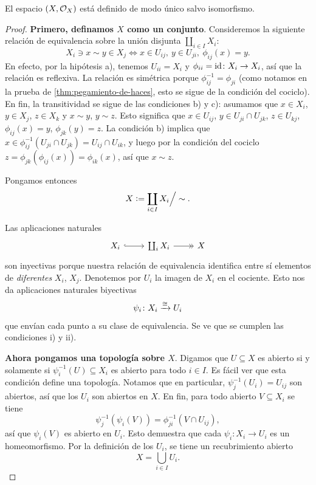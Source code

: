 \documentclass{article}
\numberwithin{equation}{section}
\theoremstyle{definition}
\begin{document}
\begin{teorema}
  El espacio $(X,\mathcal{O}_X)$ está definido de modo único salvo isomorfismo.

  \begin{proof}
    \textbf{Primero, definamos $X$ como un conjunto}.  Consideremos la siguiente
    relación de equivalencia sobre la unión disjunta $\coprod_{i\in I} X_i$:
    \[ X_i \ni x \sim y \in X_j \iff x \in U_{ij}, ~
       y \in U_{ji}, ~ \phi_{ij} (x) = y. \]
    En efecto, por la hipótesis a), tenemos $U_{ii} = X_i$ y
    $\phi_{ii} = \mathrm{id}\colon X_i \to X_i$, así que la relación es reflexiva.
    La relación es simétrica porque $\phi_{ij}^{-1} = \phi_{ji}$ (como notamos
    en la prueba de \ref{thm:pegamiento-de-haces}, esto se sigue de la condición
    del cociclo). En fin, la transitividad se sigue de las condiciones b) y c):
    asumamos que $x \in X_i$, $y \in X_j$, $z \in X_k$ y $x \sim y$, $y \sim
    z$. Esto significa que $x \in U_{ij}$, $y \in U_{ji} \cap U_{jk}$,
    $z \in U_{kj}$, $\phi_{ij} (x) = y$, $\phi_{jk} (y) = z$. La condición b)
    implica que
    $x \in \phi_{ij}^{-1} (U_{ji} \cap U_{jk}) = U_{ij} \cap U_{ik}$, y luego
    por la condición del cociclo
    $z = \phi_{jk} (\phi_{ij} (x)) = \phi_{ik} (x)$, así que $x \sim z$.

    Pongamos entonces
    $$X \mathrel{\mathop:}= \coprod_{i\in I} X_i \Bigr/ \sim.$$

    Las aplicaciones naturales
    \[ \begin{tikzcd}
        X_i \ar[hookrightarrow]{r} & \coprod_i X_i \ar[->>]{r} & X
      \end{tikzcd} \]
    son inyectivas porque nuestra relación de equivalencia identifica entre sí
    elementos de \emph{diferentes} $X_i$, $X_j$. Denotemos por $U_i$ la imagen
    de $X_i$ en el cociente. Esto nos da aplicaciones naturales biyectivas
    $$\psi_i\colon X_i \xrightarrow{\cong} U_i$$
    que envían cada punto a su clase de equivalencia. Se ve que se cumplen
    las condiciones i) y ii).

    \vspace{1em}

    \textbf{Ahora pongamos una topología sobre $X$}. Digamos que $U \subseteq X$
    es abierto si y solamente si $\psi_i^{-1} (U) \subseteq X_i$ es abierto para
    todo $i \in I$. Es fácil ver que esta condición define una
    topología. Notamos que en particular, $\psi_j^{-1} (U_i) = U_{ij}$ son
    abiertos, así que los $U_i$ son abiertos en $X$. En fin, para todo abierto
    $V \subseteq X_i$ se tiene
    $$\psi_j^{-1} (\psi_i (V)) = \phi_{ji}^{-1} (V \cap U_{ij}),$$
    así que $\psi_i (V)$ es abierto en $U_i$. Esto demuestra que cada
    $\psi_i\colon X_i \to U_i$ es un homeomorfismo. Por la definición
    de los $U_i$, se tiene un recubrimiento abierto
    $$X = \bigcup_{i\in I} U_i.$$


\end{proof}
\end{teorema}
\end{document}
